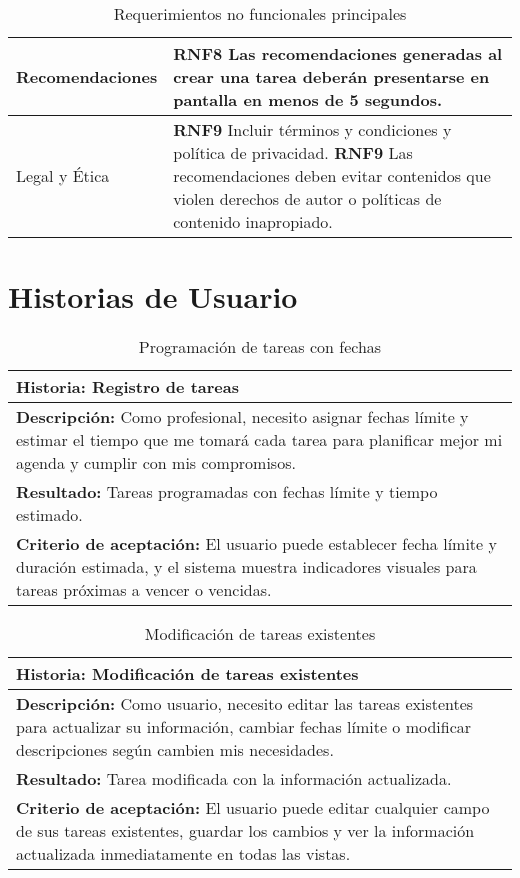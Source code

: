 \documentclass[11pt]{article}
\begin{document}
\begin{table}[H]
\begin{tabular}{|p{3cm}|p{12cm}|}
    \hline
    Recomendaciones & \textbf{RNF8} Las recomendaciones generadas al crear una tarea deberán presentarse en pantalla en menos de \textbf{5 segundos}.\\ 
    \hline
    Legal y Ética & \textbf{RNF9} Incluir términos y condiciones y política de privacidad. \newline
                   \textbf{RNF9} Las recomendaciones deben evitar contenidos que violen derechos de autor o políticas de contenido inapropiado. \\ 
    \hline
    \end{tabular}
    \caption{Requerimientos no funcionales principales}
    \label{tab:nfr}
\end{table}

\pagebreak
\section{Historias de Usuario}
\begin{table}[H]
    \centering
    \begin{tabular}{|p{15cm}|}
    \hline
    \textbf{Historia: } Registro de tareas\\
    \hline
    \textbf{Descripción: }Como profesional, necesito asignar fechas límite y estimar el tiempo que me tomará cada tarea para planificar mejor mi agenda y 
    cumplir con mis compromisos.\\
    \hline
    \textbf{Resultado: } Tareas programadas con fechas límite y tiempo estimado.\\
    \hline
    \textbf{Criterio de aceptación: } El usuario puede establecer fecha límite y duración estimada, y el sistema muestra indicadores visuales para 
    tareas próximas a vencer o vencidas.\\
    \hline
    \end{tabular}
    \caption{Programación de tareas con fechas}
    \label{user-story1}
\end{table}

\begin{table}[H]
    \centering
    \begin{tabular}{|p{15cm}|}
    \hline
    \textbf{Historia: } Modificación de tareas existentes\\
    \hline
    \textbf{Descripción: }Como usuario, necesito editar las tareas existentes para actualizar su información, cambiar fechas límite 
    o modificar descripciones según cambien mis necesidades.\\
    \hline
    \textbf{Resultado: }Tarea modificada con la información actualizada.\\
    \hline
    \textbf{Criterio de aceptación: } El usuario puede editar cualquier campo de sus tareas existentes, guardar los cambios y ver la 
    información actualizada inmediatamente en todas las vistas.\\
    \hline
    \end{tabular}
    \caption{Modificación de tareas existentes}
    \label{user-story2}
\end{table}
\end{document}
